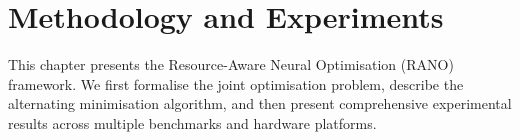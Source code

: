 \chapter{Methodology and Experiments}

This chapter presents the Resource-Aware Neural Optimisation (RANO)
framework. We first formalise the joint optimisation problem, describe
the alternating minimisation algorithm, and then present comprehensive
experimental results across multiple benchmarks and hardware platforms.
